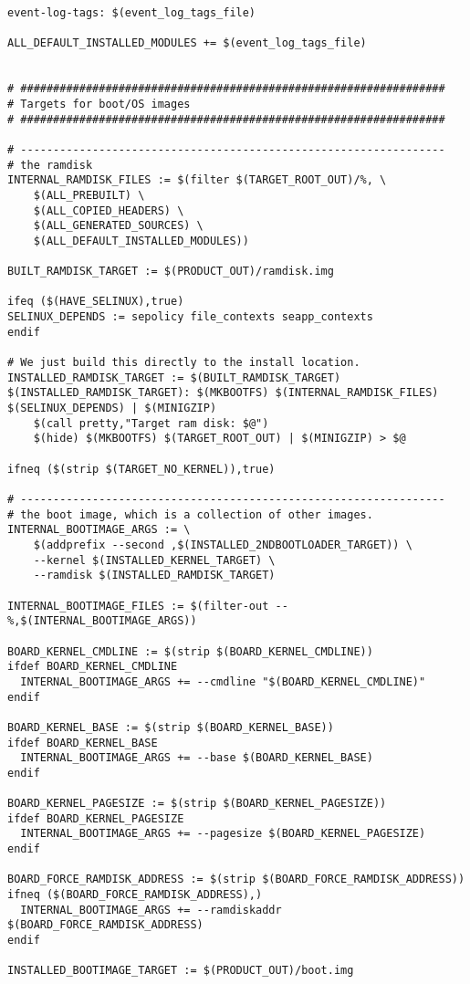 \documentclass[12pt,a4paper]{article}
\begin{document}
\begin{verbatim}
event-log-tags: $(event_log_tags_file)

ALL_DEFAULT_INSTALLED_MODULES += $(event_log_tags_file)


# #################################################################
# Targets for boot/OS images
# #################################################################

# -----------------------------------------------------------------
# the ramdisk
INTERNAL_RAMDISK_FILES := $(filter $(TARGET_ROOT_OUT)/%, \
	$(ALL_PREBUILT) \
	$(ALL_COPIED_HEADERS) \
	$(ALL_GENERATED_SOURCES) \
	$(ALL_DEFAULT_INSTALLED_MODULES))

BUILT_RAMDISK_TARGET := $(PRODUCT_OUT)/ramdisk.img

ifeq ($(HAVE_SELINUX),true)
SELINUX_DEPENDS := sepolicy file_contexts seapp_contexts
endif

# We just build this directly to the install location.
INSTALLED_RAMDISK_TARGET := $(BUILT_RAMDISK_TARGET)
$(INSTALLED_RAMDISK_TARGET): $(MKBOOTFS) $(INTERNAL_RAMDISK_FILES) $(SELINUX_DEPENDS) | $(MINIGZIP)
	$(call pretty,"Target ram disk: $@")
	$(hide) $(MKBOOTFS) $(TARGET_ROOT_OUT) | $(MINIGZIP) > $@

ifneq ($(strip $(TARGET_NO_KERNEL)),true)

# -----------------------------------------------------------------
# the boot image, which is a collection of other images.
INTERNAL_BOOTIMAGE_ARGS := \
	$(addprefix --second ,$(INSTALLED_2NDBOOTLOADER_TARGET)) \
	--kernel $(INSTALLED_KERNEL_TARGET) \
	--ramdisk $(INSTALLED_RAMDISK_TARGET)

INTERNAL_BOOTIMAGE_FILES := $(filter-out --%,$(INTERNAL_BOOTIMAGE_ARGS))

BOARD_KERNEL_CMDLINE := $(strip $(BOARD_KERNEL_CMDLINE))
ifdef BOARD_KERNEL_CMDLINE
  INTERNAL_BOOTIMAGE_ARGS += --cmdline "$(BOARD_KERNEL_CMDLINE)"
endif

BOARD_KERNEL_BASE := $(strip $(BOARD_KERNEL_BASE))
ifdef BOARD_KERNEL_BASE
  INTERNAL_BOOTIMAGE_ARGS += --base $(BOARD_KERNEL_BASE)
endif

BOARD_KERNEL_PAGESIZE := $(strip $(BOARD_KERNEL_PAGESIZE))
ifdef BOARD_KERNEL_PAGESIZE
  INTERNAL_BOOTIMAGE_ARGS += --pagesize $(BOARD_KERNEL_PAGESIZE)
endif

BOARD_FORCE_RAMDISK_ADDRESS := $(strip $(BOARD_FORCE_RAMDISK_ADDRESS))
ifneq ($(BOARD_FORCE_RAMDISK_ADDRESS),)
  INTERNAL_BOOTIMAGE_ARGS += --ramdiskaddr $(BOARD_FORCE_RAMDISK_ADDRESS)
endif

INSTALLED_BOOTIMAGE_TARGET := $(PRODUCT_OUT)/boot.img


\end{verbatim}
\end{document}
